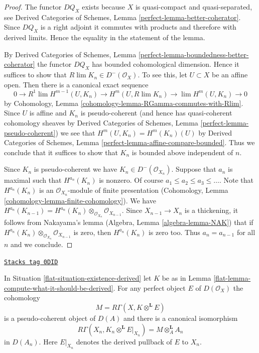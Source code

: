 \begin{proof}
The functor $DQ_X$ exists because $X$ is quasi-compact and
quasi-separated, see Derived Categories of Schemes, Lemma
\ref{perfect-lemma-better-coherator}.
Since $DQ_X$ is a right adjoint it commutes with products
and therefore with derived limits. Hence the equality
in the statement of the lemma.

\medskip\noindent
By Derived Categories of Schemes,
Lemma \ref{perfect-lemma-boundedness-better-coherator}
the functor $DQ_X$ has bounded cohomological dimension.
Hence it suffices to show that $R\lim K_n \in D^-(\mathcal{O}_X)$.
To see this, let $U \subset X$ be an affine open.
Then there is a canonical exact sequence
$$
0 \to
R^1\lim H^{m - 1}(U, K_n) \to H^m(U, R\lim K_n) \to
\lim H^m(U, K_n) \to 0
$$
by Cohomology, Lemma \ref{cohomology-lemma-RGamma-commutes-with-Rlim}.
Since $U$ is affine and $K_n$ is pseudo-coherent (and hence has
quasi-coherent cohomology sheaves by
Derived Categories of Schemes, Lemma \ref{perfect-lemma-pseudo-coherent})
we see that $H^m(U, K_n) = H^m(K_n)(U)$ by
Derived Categories of Schemes, Lemma
\ref{perfect-lemma-affine-compare-bounded}.
Thus we conclude that it suffices to show that $K_n$
is bounded above independent of $n$.

\medskip\noindent
Since $K_n$ is pseudo-coherent we have $K_n \in D^-(\mathcal{O}_{X_n})$.
Suppose that $a_n$ is maximal such that $H^{a_n}(K_n)$ is nonzero.
Of course $a_1 \leq a_2 \leq a_3 \leq \ldots$.
Note that $H^{a_n}(K_n)$ is an
$\mathcal{O}_{X_n}$-module of finite presentation
(Cohomology, Lemma \ref{cohomology-lemma-finite-cohomology}).
We have $H^{a_n}(K_{n - 1}) =
H^{a_n}(K_n) \otimes_{\mathcal{O}_{X_n}} \mathcal{O}_{X_{n - 1}}$.
Since $X_{n - 1} \to X_n$ is a thickening, it follows from
Nakayama's lemma (Algebra, Lemma \ref{algebra-lemma-NAK}) that if
$H^{a_n}(K_n) \otimes_{\mathcal{O}_{X_n}} \mathcal{O}_{X_{n - 1}}$
is zero, then $H^{a_n}(K_n)$ is zero too. Thus $a_n = a_{n - 1}$
for all $n$ and we conclude.
\end{proof}

\begin{lemma}
\label{flat-lemma-compute-against-perfect-derived}
\href{https://stacks.math.columbia.edu/tag/0DID}{\texttt{Stacks tag 0DID}}

In Situation \ref{flat-situation-existence-derived} let $K$ be as in
Lemma \ref{flat-lemma-compute-what-it-should-be-derived}. For any perfect
object $E$ of $D(\mathcal{O}_X)$ the cohomology
$$
M = R\Gamma(X, K \otimes^\mathbf{L} E)
$$
is a pseudo-coherent object of $D(A)$ and there is a canonical isomorphism
$$
R\Gamma(X_n, K_n \otimes^\mathbf{L} E|_{X_n}) = M \otimes_A^\mathbf{L} A_n
$$
in $D(A_n)$. Here $E|_{X_n}$ denotes the derived pullback of $E$ to $X_n$.
\end{lemma}

